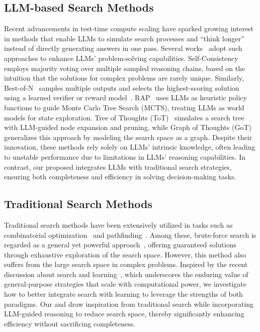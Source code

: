 \subsection{LLM-based Search Methods}
\label{appendix:related_works_LLM_search}
Recent advancements in test-time compute scaling have sparked growing interest in methods that enable LLMs to simulate search processes and ``think longer'' instead of directly generating answers in one pass. Several works~\cite{wang2023selfconsistency,hao2023reasoning,feng2023alphazerolike,yao2023tree,zhao2024large,besta2024got,wang2024litesearch,snell2024scaling} adopt such approaches to enhance LLMs' problem-solving capabilities. Self-Consistency~\cite{wang2023selfconsistency} employs majority voting over multiple sampled reasoning chains, based on the intuition that the solutions for complex problems are rarely unique. Similarly, Best-of-N~\cite{snell2024scaling} samples multiple outputs and selects the highest-scoring solution using a learned verifier or reward model~\cite{cobbe2021training,lightman2023let}. 
RAP~\cite{hao2023reasoning} uses LLMs as heuristic policy functions to guide Monte Carlo Tree Search (MCTS), treating LLMs as world models for state exploration. Tree of Thoughts (ToT)~\cite{yao2023tree} simulates a search tree with LLM-guided node expansion and pruning, while Graph of Thoughts (GoT)~\cite{besta2024got} generalizes this approach by modeling the search space as a graph. Despite their innovation, these methods rely solely on LLMs' intrinsic knowledge, often leading to unstable performance due to limitations in LLMs' reasoning capabilities. In contrast, our proposed \method integrates LLMs with traditional search strategies, ensuring both completeness and efficiency in solving decision-making tasks.

\subsection{Traditional Search Methods}
\label{appendix:related_works_traditional_search}
Traditional search methods have been extensively utilized in tasks such as combinatorial optimization~\cite{crama2005local} and pathfinding~\cite{hart1968formal}. Among these, brute-force search is regarded as a general yet powerful approach~\cite{Sutton2019BitterLesson}, offering guaranteed solutions through exhaustive exploration of the search space. However, this method also suffers from the large search space in complex problems.  
Inspired by the recent discussion about search and learning~\cite{Sutton2019BitterLesson}, which underscores the enduring value of general-purpose strategies that scale with computational power, we investigate how to better integrate search with learning to leverage the strengths of both paradigms. Our \method and \cmethod draw inspiration from traditional search while incorporating LLM-guided reasoning to reduce search space, thereby significantly enhancing efficiency without sacrificing completeness.

